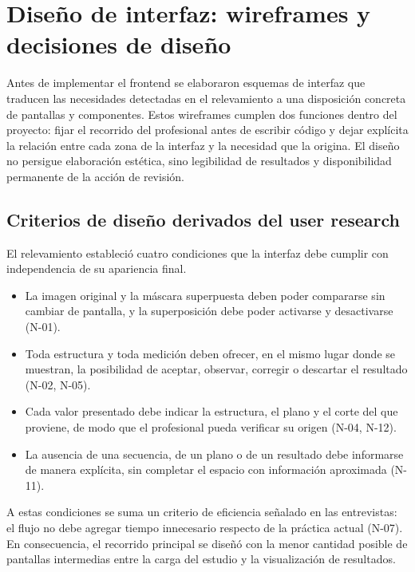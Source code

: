 \section{Diseño de interfaz: wireframes y decisiones de diseño}

Antes de implementar el frontend se elaboraron esquemas de interfaz que traducen las necesidades detectadas en el relevamiento a una disposición concreta de pantallas y componentes. Estos wireframes cumplen dos funciones dentro del proyecto: fijar el recorrido del profesional antes de escribir código y dejar explícita la relación entre cada zona de la interfaz y la necesidad que la origina. El diseño no persigue elaboración estética, sino legibilidad de resultados y disponibilidad permanente de la acción de revisión.

\subsection{Criterios de diseño derivados del user research}

El relevamiento estableció cuatro condiciones que la interfaz debe cumplir con independencia de su apariencia final.

\begin{itemize}
  \item La imagen original y la máscara superpuesta deben poder compararse sin cambiar de pantalla, y la superposición debe poder activarse y desactivarse (N-01).
  \item Toda estructura y toda medición deben ofrecer, en el mismo lugar donde se muestran, la posibilidad de aceptar, observar, corregir o descartar el resultado (N-02, N-05).
  \item Cada valor presentado debe indicar la estructura, el plano y el corte del que proviene, de modo que el profesional pueda verificar su origen (N-04, N-12).
  \item La ausencia de una secuencia, de un plano o de un resultado debe informarse de manera explícita, sin completar el espacio con información aproximada (N-11).
\end{itemize}

A estas condiciones se suma un criterio de eficiencia señalado en las entrevistas: el flujo no debe agregar tiempo innecesario respecto de la práctica actual (N-07). En consecuencia, el recorrido principal se diseñó con la menor cantidad posible de pantallas intermedias entre la carga del estudio y la visualización de resultados.

